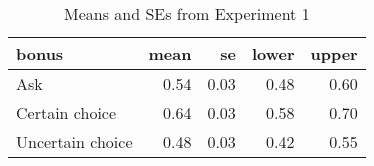 \begin{table}[ht]
\centering
\caption{Means and SEs from Experiment 1} 
\label{table:prolific_means}
\begin{tabular}{lrrrr}
  \hline
bonus & mean & se & lower & upper \\ 
  \hline
Ask & 0.54 & 0.03 & 0.48 & 0.60 \\ 
  Certain choice & 0.64 & 0.03 & 0.58 & 0.70 \\ 
  Uncertain choice & 0.48 & 0.03 & 0.42 & 0.55 \\ 
   \hline
\end{tabular}
\end{table}
